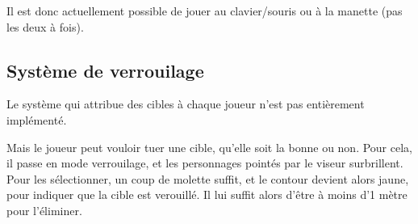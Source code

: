 \documentclass[french, 12pt]{article}
\begin{document}
            Il est donc actuellement possible de jouer au clavier/souris ou à la manette (pas les deux à fois).
        
        \subsection{Système de verrouilage}

            Le système qui attribue des cibles à chaque joueur n'est pas entièrement implémenté.
            
            Mais le joueur peut vouloir tuer une cible, qu'elle soit la bonne ou non.
            Pour cela, il passe en mode verrouilage, et les personnages pointés par le viseur surbrillent.
            Pour les sélectionner, un coup de molette suffit, et le contour devient alors jaune, pour indiquer que la cible est verouillé.
            Il lui suffit alors d'être à moins d'1 mètre pour l'éliminer.
\end{document}
